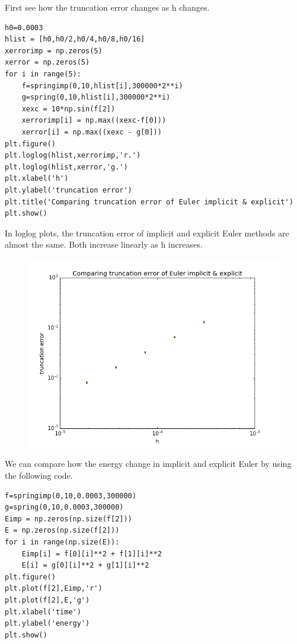 \documentclass[10pt]{article}
\begin{document}
First see how the truncation error changes as h changes.\\

\begin{lstlisting}
h0=0.0003
hlist = [h0,h0/2,h0/4,h0/8,h0/16]
xerrorimp = np.zeros(5)
xerror = np.zeros(5)
for i in range(5):
    f=springimp(0,10,hlist[i],300000*2**i)
    g=spring(0,10,hlist[i],300000*2**i)
    xexc = 10*np.sin(f[2])
    xerrorimp[i] = np.max((xexc-f[0]))
    xerror[i] = np.max((xexc - g[0]))
plt.figure()
plt.loglog(hlist,xerrorimp,'r.')
plt.loglog(hlist,xerror,'g.')
plt.xlabel('h')
plt.ylabel('truncation error')
plt.title('Comparing truncation error of Euler implicit & explicit')
plt.show()
\end{lstlisting}

In loglog plots, the truncation error of implicit and explicit Euler methods are almost the same. Both increase linearly as h increases. \\

\begin{figure}[!h]
\centering
\includegraphics[scale=0.5]{w3fig7.png}
\end{figure}

We can compare how the energy change in implicit and explicit Euler by using the following code.\\
\begin{lstlisting}
f=springimp(0,10,0.0003,300000)
g=spring(0,10,0.0003,300000)
Eimp = np.zeros(np.size(f[2]))
E = np.zeros(np.size(f[2]))
for i in range(np.size(E)):
    Eimp[i] = f[0][i]**2 + f[1][i]**2
    E[i] = g[0][i]**2 + g[1][i]**2
plt.figure()
plt.plot(f[2],Eimp,'r')
plt.plot(f[2],E,'g')
plt.xlabel('time')
plt.ylabel('energy')
plt.show()
\end{lstlisting}
\end{document}
